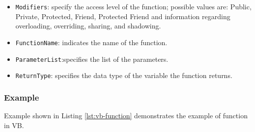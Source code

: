\begin{itemize}
	\item \texttt{Modifiers}:  specify the access level of the function; possible values are: Public, Private, Protected, Friend, Protected Friend and information regarding overloading, overriding, sharing, and shadowing.

	\item \texttt{FunctionName}: indicates the name of the function.

	\item \texttt{ParameterList}:specifies the list of the parameters.

	\item \texttt{ReturnType}: specifies the data type of the variable the function returns.
\end{itemize}



\subsubsection*{Example}
Example shown in Listing {\ref{lst:vb-function}} demonstrates the example of function in VB.


















